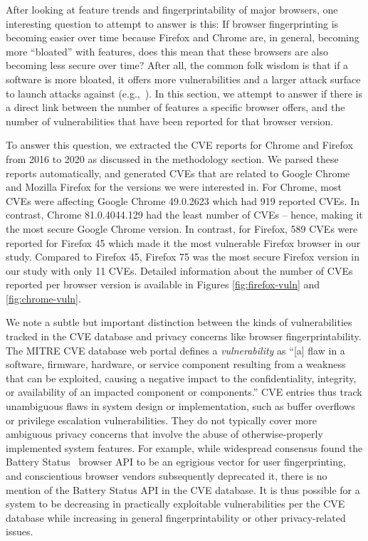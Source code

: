 After looking at feature trends and fingerprintability of major
browsers, one interesting question to attempt to answer is this: If
browser fingerprinting is becoming easier over time because Firefox
and Chrome are, in general, becoming more ``bloated'' with features,
does this mean that these browsers are also becoming less secure over
time?  After all, the common folk wisdom is that if a software is more
bloated, it offers more vulnerabilities and a larger attack surface to
launch attacks against (e.g.,~\cite{Bloating}). In this section, we
attempt to answer if there is a direct link between the number of
features a specific browser offers, and the number of vulnerabilities
that have been reported for that browser version.

To answer this question, we extracted the CVE reports for Chrome and
Firefox from 2016 to 2020 as discussed in the methodology section. We
parsed these reports automatically, and generated CVEs that are
related to Google Chrome and Mozilla Firefox for the versions we were
interested in. For Chrome, most CVEs were affecting Google Chrome
49.0.2623 which had 919 reported CVEs. In contrast, Chrome
81.0.4044.129 had the least number of CVEs -- hence, making it the
most secure Google Chrome version. In contrast, for Firefox, 589 CVEs
were reported for Firefox 45 which made it the most vulnerable Firefox
browser in our study. Compared to Firefox 45, Firefox 75 was the most
secure Firefox version in our study with only 11 CVEs. Detailed
information about the number of CVEs reported per browser version is
available in Figures \ref{fig:firefox-vuln} and \ref{fig:chrome-vuln}.

We note a subtle but important distinction between the kinds of
vulnerabilities tracked in the CVE database and privacy concerns like
browser fingerprintability. The MITRE CVE database web
portal defines a \textit{vulnerability} as ``[a] flaw in a
software, firmware, hardware, or service component resulting from a
weakness that can be exploited, causing a negative impact to the
confidentiality, integrity, or availability of an impacted component or
components.''\footnotemark
{}
CVE entries thus track unambiguous flaws in system design or
implementation, such as buffer overflows or privilege escalation
vulnerabilities.  They do not typically cover more ambiguous privacy
concerns that involve the abuse of otherwise-properly implemented system
features. For example, while widespread consensus found the Battery
Status~\cite{olejnik2017battery} browser API to be an egrigious vector
for user fingerprinting, and conscientious browser vendors subsequently
deprecated it, there is no mention of the Battery Status API in the CVE
database. It is thus possible for a system to be decreasing in
practically exploitable vulnerabilities per the CVE database while
increasing in general fingerprintability or other privacy-related
issues.


